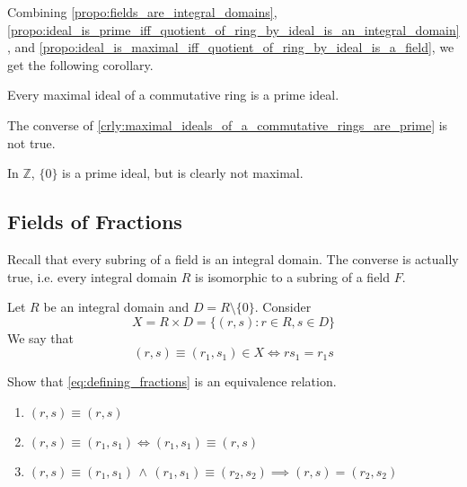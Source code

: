 Combining \cref{propo:fields_are_integral_domains}, \cref{propo:ideal_is_prime_iff_quotient_of_ring_by_ideal_is_an_integral_domain}, and \cref{propo:ideal_is_maximal_iff_quotient_of_ring_by_ideal_is_a_field}, we get the following corollary.

\begin{crly}
\label{crly:maximal_ideals_of_a_commutative_rings_are_prime}
  Every maximal ideal of a commutative ring is a prime ideal.
\end{crly}

\begin{note}
  The converse of \cref{crly:maximal_ideals_of_a_commutative_rings_are_prime} is not true.
\end{note}

\begin{eg}
  In $\mathbb{Z}$, $\{0\}$ is a prime ideal, but is clearly not maximal.
\end{eg}


\subsection{Fields of Fractions}%
\label{sub:fields_of_fractions}

Recall that every subring of a field is an integral domain. The converse is actually true, i.e. every integral domain $R$ is isomorphic to a subring of a field $F$.

Let $R$ be an integral domain and $D = R \setminus \{0\}$. Consider
\begin{equation*}
  X = R \times D = \{ (r, s) : r \in R, s \in D \}
\end{equation*}
We say that
\begin{equation}\label{eq:defining_fractions}
  (r, s) \equiv (r_1, s_1) \in X \iff rs_1 = r_1 s
\end{equation}

\begin{eg}
  Show that \cref{eq:defining_fractions} is an equivalence relation.
  \begin{enumerate}
    \item $(r, s) \equiv (r, s)$
    \item $(r, s) \equiv (r_1, s_1) \iff (r_1, s_1) \equiv (r, s)$
    \item $(r, s) \equiv (r_1, s_1) \, \land \, (r_1, s_1) \equiv (r_2, s_2) \implies (r, s) = (r_2, s_2)$
  \end{enumerate}
\end{eg}

